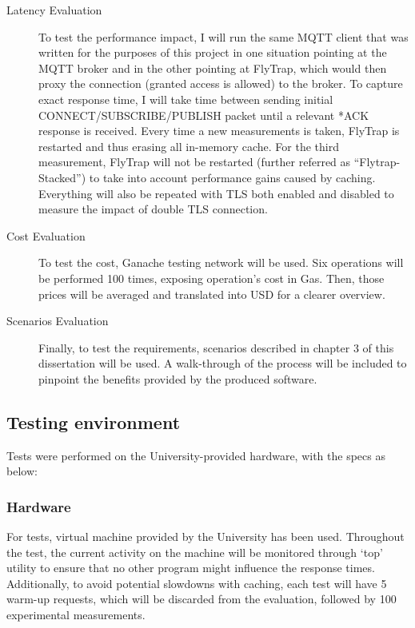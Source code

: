 \begin{description}
    \item[Latency Evaluation] To test the performance impact, I will run the same MQTT client that was written for the purposes of this project in one situation pointing at the MQTT broker and in the other pointing at FlyTrap, which would then proxy the connection (granted access is allowed) to the broker. To capture exact response time, I will take time between sending initial CONNECT/SUBSCRIBE/PUBLISH packet until a relevant *ACK response is received. Every time a new measurements is taken, FlyTrap is restarted and thus erasing all in-memory cache. For the third measurement, FlyTrap will not be restarted (further referred as ``Flytrap-Stacked'') to take into account performance gains caused by caching. Everything will also be repeated with TLS both enabled and disabled to measure the impact of double TLS connection.
    \item[Cost Evaluation] To test the cost, Ganache testing network will be used. Six operations will be performed 100 times, exposing operation's cost in Gas. Then, those prices will be averaged and translated into USD for a clearer overview.
    \item[Scenarios Evaluation] Finally, to test the requirements, scenarios described in chapter 3 of this dissertation will be used. A walk-through of the process will be included to pinpoint the benefits provided by the produced software.
\end{description}

\subsection{Testing environment}
Tests were performed on the University-provided hardware, with the specs as below:
\subsubsection{Hardware}
For tests, virtual machine provided by the University has been used. Throughout the test, the current activity on the machine will be monitored through `top' utility to ensure that no other program might influence the response times. Additionally, to avoid potential slowdowns with caching, each test will have 5 warm-up requests, which will be discarded from the evaluation, followed by 100 experimental measurements.

